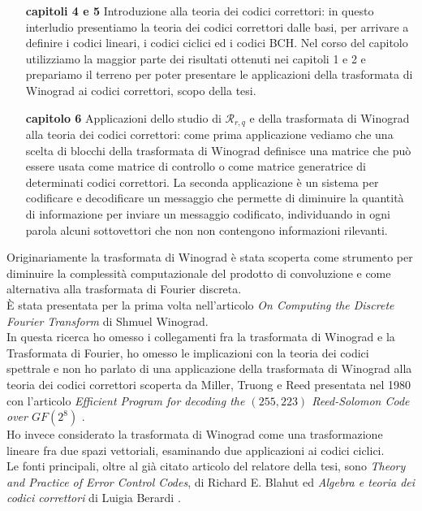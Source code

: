 \begin{enumerate}
   \item[{\bf capitoli 4 e 5}] Introduzione alla teoria dei codici correttori: in questo interludio presentiamo la teoria dei codici correttori dalle basi, per arrivare a definire i codici lineari, i codici ciclici ed i codici BCH. Nel corso del capitolo utilizziamo la maggior parte dei risultati ottenuti nei capitoli 1 e 2 e prepariamo il terreno per poter presentare le applicazioni della trasformata di Winograd ai codici correttori, scopo della tesi.

   \item[{\bf capitolo 6}] Applicazioni dello studio di $\mathcal{R}_{r,q}$ e della trasformata di Winograd alla teoria dei codici correttori: come prima applicazione vediamo che una scelta di blocchi della trasformata di Winograd definisce una matrice che può essere usata come matrice di controllo o come matrice generatrice di determinati codici correttori. La seconda applicazione è un sistema per codificare e decodificare un messaggio che permette di diminuire la quantità di informazione per inviare un messaggio codificato, individuando in ogni parola alcuni sottovettori che non non contengono informazioni rilevanti.
\end{enumerate}
\noindent
Originariamente la trasformata di Winograd è stata scoperta come strumento per diminuire la complessità computazionale del prodotto di convoluzione e come alternativa alla trasformata di Fourier discreta. \\
È stata presentata per la prima volta nell'articolo \emph{On Computing the Discrete Fourier Transform} \cite{winograd2} di Shmuel Winograd. \\
In questa ricerca ho omesso i collegamenti fra la trasformata di Winograd e la Trasformata di Fourier, ho omesso le implicazioni con la teoria dei codici spettrale e non ho parlato di una applicazione della trasformata di Winograd alla teoria dei codici correttori scoperta da Miller, Truong e Reed presentata nel 1980 con l'articolo \emph{Efficient Program for decoding the $(255,223)$ Reed-Solomon Code over $GF(2^{8})$} \cite{miller}. \\
Ho invece considerato la trasformata di Winograd come una trasformazione lineare fra due spazi vettoriali, esaminando due applicazioni ai codici ciclici. \\
Le fonti principali, oltre al già citato articolo del relatore della tesi, sono \emph{Theory and Practice of Error Control Codes}, di Richard E. Blahut \cite{blahut} ed \emph{Algebra e teoria dei codici correttori} di Luigia Berardi \cite{berardi}.
%
\newpage
%
